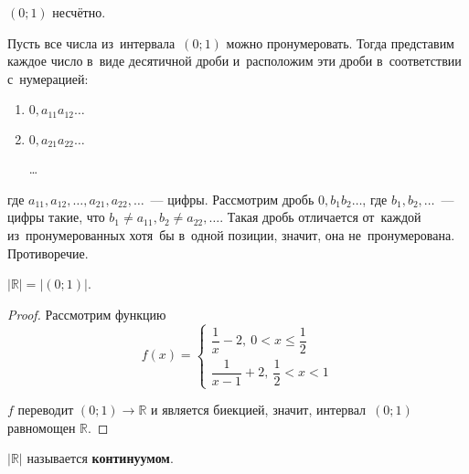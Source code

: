 \begin{statement}
$(0; 1)$ несчётно.
\end{statement}
\begin{proofcontra}
Пусть все числа из~интервала~$(0; 1)$ можно пронумеровать.
Тогда представим каждое число в~виде десятичной дроби и~расположим эти дроби в~соответствии с~нумерацией:
\begin{enumerate}
	\item $0{,}a_{11}a_{12} \ldots$
	\item $0{,}a_{21}a_{22} \ldots$
	
	\ldots
\end{enumerate}
где $a_{11}, a_{12}, \ldots, a_{21}, a_{22}, \ldots$~--- цифры.
Рассмотрим дробь $0{,}b_1 b_2 \ldots$, где $b_1, b_2, \ldots$~--- цифры такие, что $b_1 \neq a_{11}, b_2 \neq a_{22}, \ldots$.
Такая дробь отличается от~каждой из~пронумерованных хотя~бы в~одной позиции, значит, она не~пронумерована.
Противоречие.
\end{proofcontra}

\begin{statement}
$|\mathbb R| = |(0; 1)|$.
\end{statement}
\begin{proof}
Рассмотрим функцию
\begin{equation*}
f(x) =
\begin{cases}
\dfrac1x - 2, \ 0 < x \leqslant \dfrac12 \\
\dfrac1{x - 1} + 2, \ \dfrac12 < x < 1
\end{cases}
\end{equation*}

$f$ переводит $(0; 1) \to \mathbb R$ и является биекцией, значит, интервал~$(0; 1)$ равномощен $\mathbb R$.
\end{proof}

$|\mathbb R|$ называется \textbf{континуумом}.